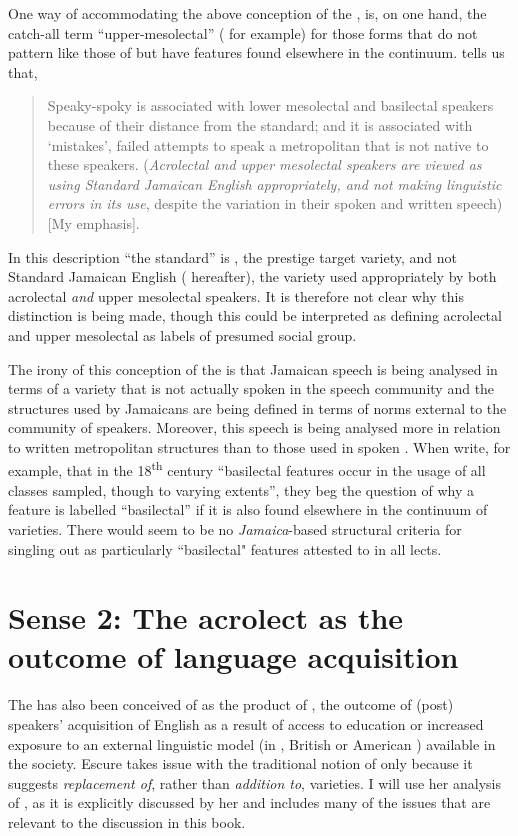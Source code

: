 One way of accommodating the above conception of the , is, on one hand, the catch-all term “upper-mesolectal” (\citealt[161--162]{Bickerton1975} for example) for those forms that do not pattern like those of  but have features found elsewhere in the continuum.  \citet[17]{Patrick2002} tells us that,

\begin{quote}Speaky-spoky is associated with lower mesolectal and basilectal speakers because of their distance from the standard; and it is associated with ‘mistakes’, failed attempts to speak a metropolitan  that is not native to these speakers. ({\itshape Acrolectal and upper mesolectal speakers are viewed as using Standard Jamaican English appropriately, and not making linguistic errors in its use}, despite the variation in their spoken and written speech) [My emphasis].\end{quote}

In this description “the standard” is , the prestige target variety, and not Standard Jamaican English ( hereafter), the variety used appropriately by both acrolectal \textit{and} upper mesolectal speakers.  It is therefore not clear why this distinction is being made, though this could be interpreted as defining acrolectal and upper mesolectal as labels of presumed social group.  

The irony of this conception of the  is that Jamaican speech is being analysed in terms of a variety that is not actually spoken in the speech community and the structures used by Jamaicans are being defined in terms of norms external to the community of speakers.  Moreover, this speech is being analysed more in relation to written metropolitan structures than to those used in spoken .  When \citet[89]{LallaDCosta1990} write, for example, that in the 18\textsuperscript{th} century “basilectal features occur in the usage of all classes sampled, though to varying extents”, they beg the question of why a feature is labelled “basilectal” if it is also found elsewhere in the continuum of varieties.  There would seem to be no \textit{Jamaica}-based structural criteria for singling out as particularly ``basilectal" features attested to in all lects.

\section{Sense 2: The acrolect as the outcome of language acquisition}%
The  has also been conceived of as the product of  \citep{Escure1997}, the outcome of (post)  speakers’ acquisition of English as a result of access to education or increased exposure to an external linguistic model (in , British or American ) available in the society.  Escure takes issue with the traditional notion of  only because it suggests \textit{replacement of}, rather than \textit{addition to},  varieties.  I will use her analysis of , as it is explicitly discussed by her and includes many of the issues that are relevant to the discussion in this book.  

